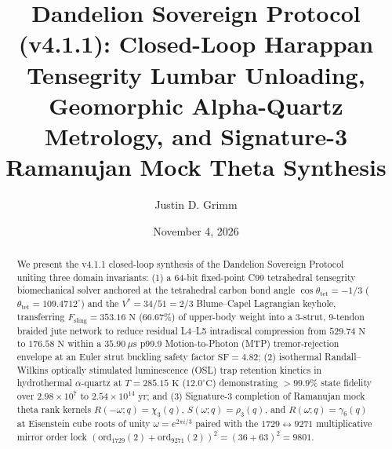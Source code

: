 \documentclass[aps,prl,twocolumn,superscriptaddress,10pt]{revtex4-2}
\begin{document}
\title{Dandelion Sovereign Protocol (v4.1.1): Closed-Loop Harappan Tensegrity Lumbar Unloading, Geomorphic Alpha-Quartz Metrology, and Signature-3 Ramanujan Mock Theta Synthesis}

\author{Justin D. Grimm}

\date{November 4, 2026}

\begin{abstract}
We present the v4.1.1 closed-loop synthesis of the Dandelion Sovereign Protocol uniting three domain invariants: (1) a 64-bit fixed-point C99 tetrahedral tensegrity biomechanical solver anchored at the tetrahedral carbon bond angle $\cos\theta_{\text{tet}} = -1/3$ ($\theta_{\text{tet}} = 109.4712^\circ$) and the $V^* = 34/51 = 2/3$ Blume--Capel Lagrangian keyhole, transferring $F_{\text{sling}} = 353.16\text{ N}$ ($66.67\%$) of upper-body weight into a 3-strut, 9-tendon braided jute network to reduce residual L4--L5 intradiscal compression from $529.74\text{ N}$ to $176.58\text{ N}$ within a $35.90\ \mu\text{s}$ p99.9 Motion-to-Photon (MTP) tremor-rejection envelope at an Euler strut buckling safety factor $\text{SF} = 4.82$; (2) isothermal Randall--Wilkins optically stimulated luminescence (OSL) trap retention kinetics in hydrothermal $\alpha$-quartz at $T = 285.15\text{ K}$ ($12.0^\circ\text{C}$) demonstrating $>99.9\%$ state fidelity over $2.98\times 10^7$ to $2.54\times 10^{14}\text{ yr}$; and (3) Signature-3 completion of Ramanujan mock theta rank kernels $R(-\omega;q) = \chi_3(q)$, $S(\omega;q) = \rho_3(q)$, and $R(\omega;q) = \gamma_6(q)$ at Eisenstein cube roots of unity $\omega = e^{2\pi i/3}$ paired with the $1729 \leftrightarrow 9271$ multiplicative mirror order lock $(\text{ord}_{1729}(2) + \text{ord}_{9271}(2))^2 = (36 + 63)^2 = 9801$.
\end{abstract}

\maketitle

\noindent{}
\vspace{4pt}
\end{document}

